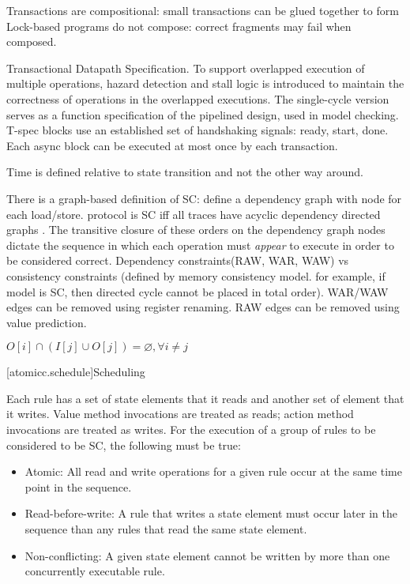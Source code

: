 Transactions are compositional: small transactions can be glued together to form 
Lock-based programs do not compose: correct fragments may fail when composed.

Transactional Datapath Specification.  \cite{nurvitadhi2011automatic}
To support overlapped execution of multiple operations,
hazard detection and stall logic is introduced to maintain
the correctness of operations in the overlapped executions.
The single-cycle version serves as a function specification of the pipelined
design, used in model checking.
T-spec blocks use an established set of handshaking signals: ready, start, done.
Each async block can be executed at most once by each transaction.

Time is defined relative to state transition and not the other way around.
\cite{fox2003algebraic}

There is a graph-based definition of SC: define a dependency graph with node for each load/store.
protocol is SC iff all traces have acyclic dependency directed graphs
\cite{Cain2003}.
The transitive closure of these orders on the dependency graph nodes dictate
the sequence in which each operation must \textit{appear} to execute in order to
be considered correct.
Dependency constraints(RAW, WAR, WAW) vs consistency constraints (defined by memory consistency model.  for example, if model is SC, then directed cycle cannot be placed in total order).
WAR/WAW edges can be removed using register renaming.  RAW edges
can be removed using value prediction.

$O[i] \cap (I[j] \cup O[j]) = \varnothing, \forall i \neq j $
\cite[Sec.~7.3]{GrayR93}

[atomicc.schedule]{Scheduling}

Each rule has a set of state elements that it reads and another set of element that it writes.
Value method invocations are treated as reads; action method invocations are treated as writes.
For the execution of a group of rules to be considered to be SC, the following must
be true:
\begin{itemize}
\item Atomic: All read and write operations for a given rule occur at the same time point in the sequence.
\item Read-before-write:  A rule that writes a state element must occur later in the sequence
than any rules that read the same state element.
\item Non-conflicting: A given state element cannot be written by more than one concurrently executable rule.
\end{itemize}

